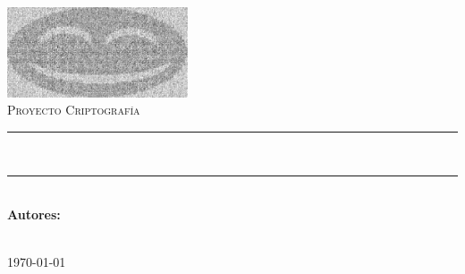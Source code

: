 \newcommand{\HRule}{\rule{\linewidth}{0.5mm}}

\begin{titlepage}
\begin{center}
	\includegraphics[width=0.4\textwidth]{images/logo}~
	\\[1cm]

	\textsc{Proyecto Criptografía}

	\HRule \\[0.4cm]
	\textsc{\LARGE \Title}
	\HRule \\[0.4cm]

	\large \textbf{Autores:}\\
	\Authors
	\\[1cm]

	\vfill

	\begin{flushright}
		\large \today
	\end{flushright}

\end{center}
\end{titlepage}
